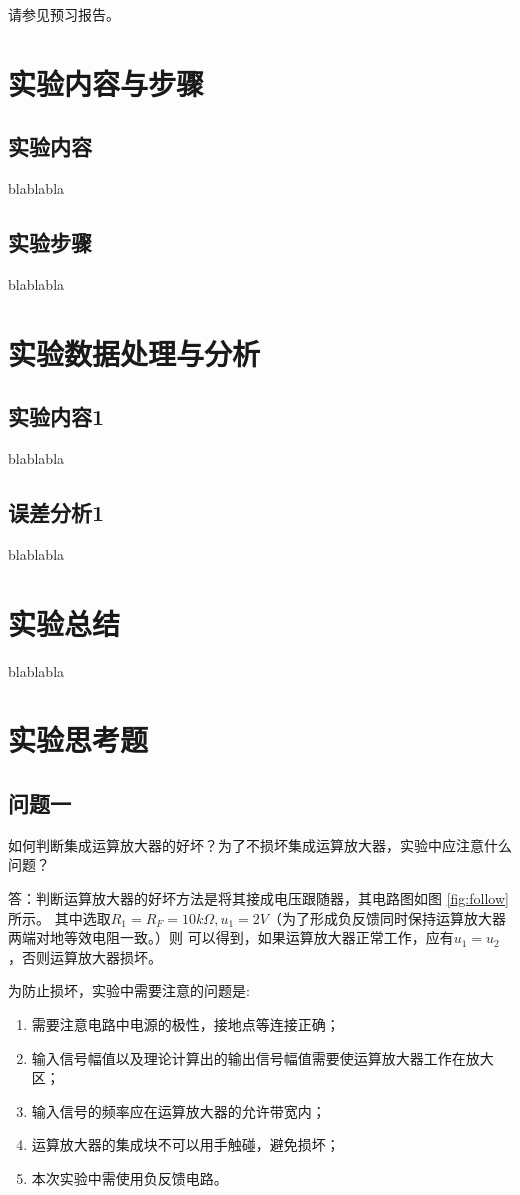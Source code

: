\documentclass[a4paper,11pt,UTF8]{ctexart}
\begin{document}
请参见预习报告。

\section{实验内容与步骤}
\subsection{实验内容}
	blablabla
\subsection{实验步骤}
	blablabla

\section{实验数据处理与分析}
\subsection{实验内容1}
	blablabla
\subsection{误差分析1}
	blablabla

\section{实验总结}
blablabla
\section{实验思考题}
\subsection{问题一}
如何判断集成运算放大器的好坏？为了不损坏集成运算放大器，实验中应注意什么问题？

答：判断运算放大器的好坏方法是将其接成电压跟随器，其电路图如图 \ref{fig:follow}所示。
其中选取$R_1=R_F=10k\Omega,u_1=2V$（为了形成负反馈同时保持运算放大器两端对地等效电阻一致。）则
可以得到，如果运算放大器正常工作，应有$u_1=u_2$，否则运算放大器损坏。

为防止损坏，实验中需要注意的问题是:
\begin{enumerate}
  \item 需要注意电路中电源的极性，接地点等连接正确；
  \item 输入信号幅值以及理论计算出的输出信号幅值需要使运算放大器工作在放大区；
  \item 输入信号的频率应在运算放大器的允许带宽内；
  \item 运算放大器的集成块不可以用手触碰，避免损坏；
  \item 本次实验中需使用负反馈电路。
\end{enumerate}
\end{document}
